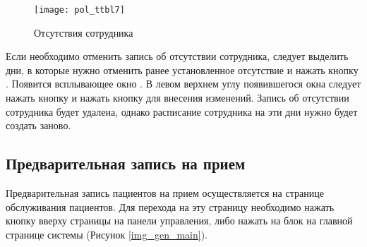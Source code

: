 \begin{figure}[ht]\centering
 \texttt{[image: pol\_ttbl7]}
 \caption{Отсутствия сотрудника}
 \label{img_pol_ttbl7}
\end{figure}

Если необходимо отменить запись об отсутствии сотрудника, следует выделить дни, в которые нужно отменить ранее установленное отсутствие и нажать кнопку . Появится всплывающее окно . В левом верхнем углу появившегося окна следует нажать кнопку  и нажать кнопку  для внесения изменений. Запись об отсутствии сотрудника будет удалена, однако расписание сотрудника на эти дни нужно будет создать заново. 

\subsection{Предварительная запись на прием}

Предварительная запись пациентов на прием осуществляется на странице обслуживания пациентов. Для перехода на эту страницу необходимо нажать кнопку  вверху страницы на панели управления, либо нажать на блок  на главной странице системы (Рисунок \ref{img_gen_main}).


